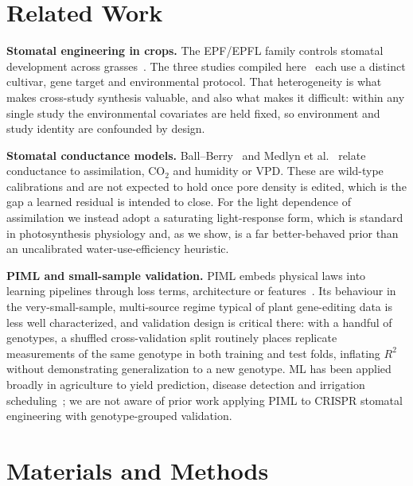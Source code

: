 \documentclass[runningheads]{llncs}
\begin{document}
\section{Related Work}\label{sec:related}

\textbf{Stomatal engineering in crops.} The EPF/EPFL family controls stomatal development across grasses~\cite{ref_hepworth}. The three studies compiled here~\cite{ref_caine,ref_kara2023,ref_kara2024} each use a distinct cultivar, gene target and environmental protocol. That heterogeneity is what makes cross-study synthesis valuable, and also what makes it difficult: within any single study the environmental covariates are held fixed, so environment and study identity are confounded by design.

\textbf{Stomatal conductance models.} Ball--Berry~\cite{ref_ball_berry} and Medlyn et al.~\cite{ref_medlyn} relate conductance to assimilation, CO$_2$ and humidity or VPD. These are wild-type calibrations and are not expected to hold once pore density is edited, which is the gap a learned residual is intended to close. For the light dependence of assimilation we instead adopt a saturating light-response form, which is standard in photosynthesis physiology and, as we show, is a far better-behaved prior than an uncalibrated water-use-efficiency heuristic.

\textbf{PIML and small-sample validation.} PIML embeds physical laws into learning pipelines through loss terms, architecture or features~\cite{ref_karniadakis,ref_willard}. Its behaviour in the very-small-sample, multi-source regime typical of plant gene-editing data is less well characterized, and validation design is critical there: with a handful of genotypes, a shuffled cross-validation split routinely places replicate measurements of the same genotype in both training and test folds, inflating $R^{2}$ without demonstrating generalization to a new genotype. ML has been applied broadly in agriculture to yield prediction, disease detection and irrigation scheduling~\cite{ref_ml_agri}; we are not aware of prior work applying PIML to CRISPR stomatal engineering with genotype-grouped validation.

\section{Materials and Methods}\label{sec:methods}
\end{document}
